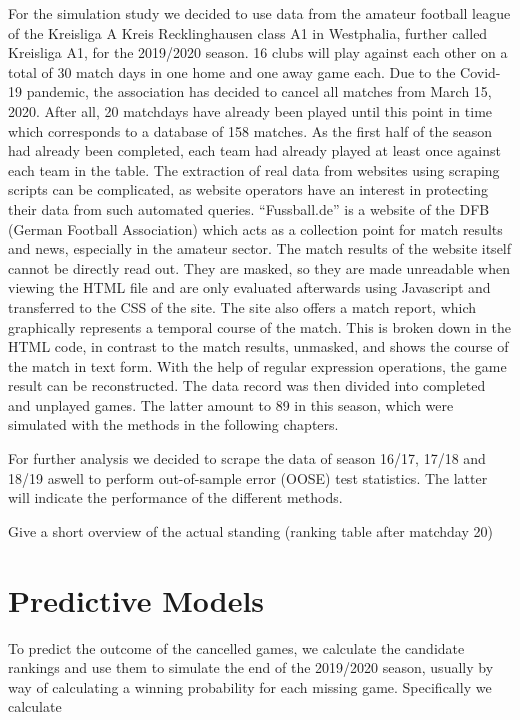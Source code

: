 \documentclass[12pt,a4paper]{article}
\begin{document}
For the simulation study we decided to use data from the amateur
football league of the Kreisliga A Kreis Recklinghausen class A1 in
Westphalia, further called Kreisliga A1, for the 2019/2020 season. 16
clubs will play against each other on a total of 30 match days in one
home and one away game each. Due to the Covid-19 pandemic, the
association has decided to cancel all matches from March 15, 2020. After
all, 20 matchdays have already been played until this point in time
which corresponds to a database of 158 matches. As the first half of the
season had already been completed, each team had already played at least
once against each team in the table. The extraction of real data from
websites using scraping scripts can be complicated, as website operators
have an interest in protecting their data from such automated queries.
\enquote{Fussball.de} is a website of the DFB (German Football
Association) which acts as a collection point for match results and
news, especially in the amateur sector. The match results of the website
itself cannot be directly read out. They are masked, so they are made
unreadable when viewing the HTML file and are only evaluated afterwards
using Javascript and transferred to the CSS of the site. The site also
offers a match report, which graphically represents a temporal course of
the match. This is broken down in the HTML code, in contrast to the
match results, unmasked, and shows the course of the match in text form.
With the help of regular expression operations, the game result can be
reconstructed. The data record was then divided into completed and
unplayed games. The latter amount to 89 in this season, which were
simulated with the methods in the following chapters.

For further analysis we decided to scrape the data of season 16/17,
17/18 and 18/19 aswell to perform out-of-sample error (OOSE) test
statistics. The latter will indicate the performance of the different
methods.

Give a short overview of the actual standing (ranking table after
matchday 20)

\hypertarget{predictive-models}{%
\section{Predictive Models}\label{predictive-models}}

To predict the outcome of the cancelled games, we calculate the
candidate rankings and use them to simulate the end of the 2019/2020
season, usually by way of calculating a winning probability for each
missing game. Specifically we calculate
\end{document}
